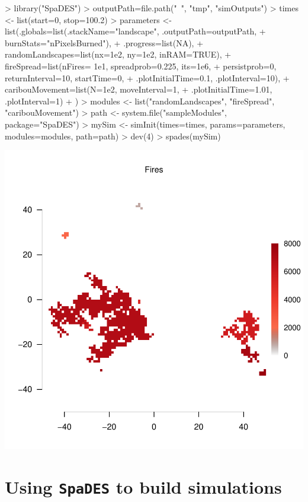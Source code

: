\documentclass{article}
\begin{document}
\begin{Schunk}
\begin{Sinput}
> library("SpaDES")
> outputPath=file.path("~", "tmp", "simOutputs")
> times <- list(start=0, stop=100.2)
> parameters <- list(.globals=list(.stackName="landscape", .outputPath=outputPath,
+                                  burnStats="nPixelsBurned"),
+                    .progress=list(NA),
+                    randomLandscapes=list(nx=1e2, ny=1e2, inRAM=TRUE),
+                    fireSpread=list(nFires= 1e1, spreadprob=0.225, its=1e6,
+                                    persistprob=0, returnInterval=10, startTime=0,
+                                   .plotInitialTime=0.1, .plotInterval=10),
+                    caribouMovement=list(N=1e2, moveInterval=1,
+                                         .plotInitialTime=1.01, .plotInterval=1)
+                    )
> modules <- list("randomLandscapes", "fireSpread", "caribouMovement")
> path <- system.file("sampleModules", package="SpaDES")
> mySim <- simInit(times=times, params=parameters, modules=modules, path=path)
> dev(4)
> spades(mySim)
\end{Sinput}
\end{Schunk}
\includegraphics{introduction-using-SpaDES}

\newpage

\section{Using \texttt{SpaDES} to build simulations}
\end{document}
